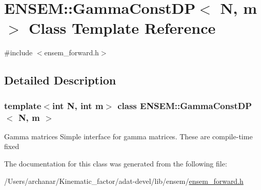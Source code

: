 \hypertarget{classENSEM_1_1GammaConstDP}{}\section{E\+N\+S\+EM\+:\+:Gamma\+Const\+DP$<$ N, m $>$ Class Template Reference}
\label{classENSEM_1_1GammaConstDP}


{\ttfamily \#include $<$ensem\+\_\+forward.\+h$>$}



\subsection{Detailed Description}
\subsubsection*{template$<$int N, int m$>$\newline
class E\+N\+S\+E\+M\+::\+Gamma\+Const\+D\+P$<$ N, m $>$}

Gamma matrices Simple interface for gamma matrices. These are compile-\/time fixed 

The documentation for this class was generated from the following file\+:\begin{DoxyCompactItemize}
\item 
/\+Users/archanar/\+Kinematic\+\_\+factor/adat-\/devel/lib/ensem/\mbox{\hyperlink{adat-devel_2lib_2ensem_2ensem__forward_8h}{ensem\+\_\+forward.\+h}}\end{DoxyCompactItemize}
